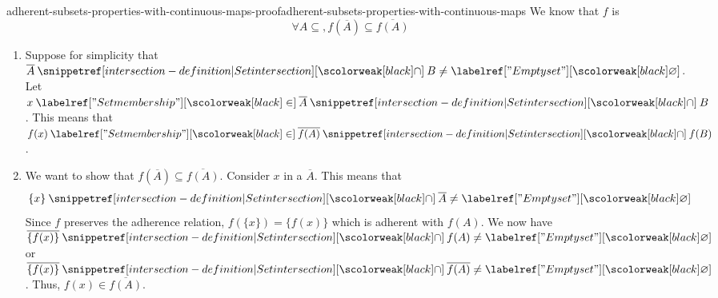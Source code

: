 \documentclass[preview]{standalone}
\begin{document}
\begin{snippetproof}{adherent-subsets-properties-with-continuous-maps-proof}{adherent-subsets-properties-with-continuous-maps}{}
    We know that \(f\) is \topologycontinuous \ifandonlyif 
    \[
        \forall A \subseteq, f(\overline{A}) \subseteq \overline{f(A)}
    \]
    \begin{enumerate}
        \item Suppose for simplicity that \(\overline{A} \intersection B \neq \emptyset\).
        Let \(x\in \overline{A} \intersection B\).
        This means that \(f(x) \in \overline{f(A)} \intersection f(B)\).
        \item We want to show that \(f(\overline{A}) \subseteq \overline{f(A)}\).
        Consider \(x\) in a \closedset \(\overline{A}\). This means that
        \[
            \{x\} \intersection \overline{A} \neq \emptyset
        \]
        Since \(f\) preserves the adherence relation, \(f(\{x\}) = \{f(x)\}\)
        which is adherent with \(f(A)\).
        We now have \(\overline{\{f(x)\}} \intersection f(A) \neq \emptyset\)
        or  \(\overline{\{f(x)\}} \intersection \overline{f(A)} \neq \emptyset\).
        Thus, \(f(x) \in \overline{f(A)}\).
    \end{enumerate}
\end{snippetproof}

\end{document}

